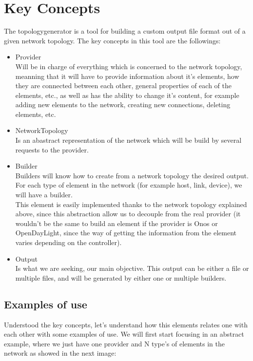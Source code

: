\section{Key Concepts}

The topologygenerator is a tool for building a custom output file format out of a given network topology. The key concepts in this tool are the followings:
\begin{itemize}
\item Provider \\
Will be in charge of everything which is concerned to the network topology, meanning that it will have to provide information about it's elements, how they are connected between each other, general properties of each of the elements, etc., as well as has the ability to change it's content, for example adding new elements to the network, creating new connections, deleting elements, etc.
\item NetworkTopology \\
Is an abastract representation of the network which will be build by several requests to the provider.
\item Builder \\
Builders will know how to create from a network topology the desired output. For each type of element in the network (for example host, link, device), we will have a builder.\\
This element is easily implemented thanks to the network topology explained above, since this abstraction allow us to decouple from the real provider (it wouldn't be the same to build an element if the provider is Onos or OpenDayLight, since the way of getting the information from the element varies depending on the controller). \\
\item Output \\
Is what we are seeking, our main objective. This output can be either a file or multiple files, and will be generated by either one or multiple builders.
\end{itemize}

\subsection{Examples of use}

Understood the key concepts, let's understand how this elements relates one with each other with some examples of use. We will first start focusing in an abstract example, where we just have one provider and N type's of elements in the network as showed in the next image:

